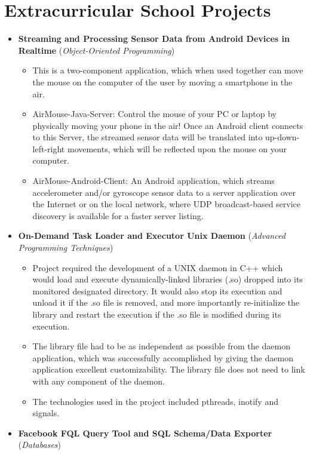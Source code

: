 \documentclass[12pt,a4paper]{article}
\begin{document}
\section*{Extracurricular School Projects}
	\begin{itemize}
	\item	\textbf{Streaming and Processing Sensor Data from Android Devices in Realtime} (\textit{Object-Oriented Programming})
		\begin{itemize}
		\item	This is a two-component application, which when used together can move the mouse on the computer of the user by moving a smartphone in the air.
		\item	AirMouse-Java-Server: Control the mouse of your PC or laptop by physically moving your phone in the air! Once an Android client connects to this Server, the streamed sensor data will be translated into up-down-left-right movements, which will be reflected upon the mouse on your computer.
		\item	AirMouse-Android-Client: An Android application, which streams accelerometer and/or gyroscope sensor data to a server application over the Internet or on the local network, where UDP broadcast-based service discovery is available for a faster server listing.
		\end{itemize}
	\item	\textbf{On-Demand Task Loader and Executor Unix Daemon} (\textit{Advanced Programming Techniques})
		\begin{itemize}
		\item	Project required the development of a UNIX daemon in C++ which would load and execute dynamically-linked libraries (.so) dropped into its monitored designated directory. It would also stop its execution and unload it if the .so file is removed, and more importantly re-initialize the library and restart the execution if the .so file is modified during its execution.
		\item	The library file had to be as independent as possible from the daemon application, which was successfully accomplished by giving the daemon application excellent customizability. The library file does not need to link with any component of the daemon.
		\item	The technologies used in the project included pthreads, inotify and signals.
		\end{itemize}
	\item	\textbf{Facebook FQL Query Tool and SQL Schema/Data Exporter} (\textit{Databases})

\end{itemize}
\end{document}
